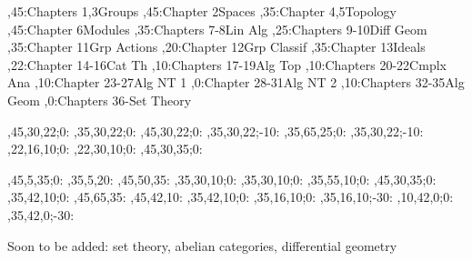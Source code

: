
\setcounter{diagheight}{50}
\begin{chart}
,45:{Chapters 1,3}{Groups}{}
,45:{Chapter 2}{Spaces}{}
,35:{Chapter 4,5}{Topology}{}
,45:{Chapter 6}{Modules}{}
,35:{Chapters 7-8}{Lin Alg}{}
,25:{Chapters 9-10}{Diff Geom}{}
,35:{Chapter 11}{Grp Actions}{}
,20:{Chapter 12}{Grp Classif}{}
,35:{Chapter 13}{Ideals}{}
,22:{Chapter 14-16}{Cat Th}{}
,10:{Chapters 17-19}{Alg Top}{}
,10:{Chapters 20-22}{Cmplx Ana}{}
,10:{Chapter 23-27}{Alg NT 1}{}
,0:{Chapter 28-31}{Alg NT 2}{}
,10:{Chapters 32-35}{Alg Geom}{}
,0:{Chapters 36-}{Set Theory}{}

,45,30,22;0:   %
,35,30,22;0:   %
,45,30,22;0:   %
,35,30,22;-10: %
,35,65,25;0:   %
,35,30,22;-10: %
,22,16,10;0:   %
,22,30,10;0:   %
,45,30,35;0:   %

,45,5,35;0:    %
,35,5,20:      %
,45,50,35:     %
,35,30,10;0:   %
,35,30,10;0:   %
,35,55,10;0:   %
,45,30,35;0:   %
,35,42,10;0:   %
,45,65,35:     %
,45,42,10:     %
,35,42,10;0:   %
,35,16,10;0:   %
,35,16,10;-30: %
,10,42,0;0:    %
,35,42,0;-30:  %
\end{chart}

Soon to be added: set theory, abelian categories, differential geometry
